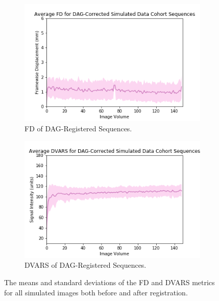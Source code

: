 \begin{figure}[]
	\begin{subfigure}{0.4\textwidth}
		\centering
		\includegraphics[width=1.0\textwidth]{6/figures/spectr-dag-fd-150.png}
		\caption{FD of DAG-Registered Sequences.}
	\end{subfigure}
	\hspace{0.05\textwidth}
	\begin{subfigure}{0.4\textwidth}
		\centering
		\includegraphics[width=1.0\textwidth]{6/figures/spectr-dag-dvars-150.png}
		\caption{DVARS of DAG-Registered Sequences.}
	\end{subfigure}
\caption{The means and standard deviations of the FD and DVARS metrics for all simulated images both before and after registration.}
\label{fig:spectr-power-dists}
\end{figure}

